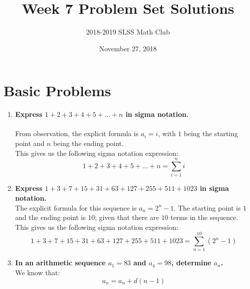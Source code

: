 \documentclass[12pt]{article}
\title{Week 7 Problem Set Solutions\vspace{-3mm}}
\author{2018-2019 SLSS Math Club\vspace{-5mm}}
\date{November 27, 2018\vspace{-5mm}}
\begin{document}
\maketitle

\newcommand{\bspace}{\\ \\ \\ \\ \\ \\ \\} 
\section*{Basic Problems}
\begin{enumerate}
    \item \textbf{Express $1 + 2 + 3 + 4 + 5 + \dots + n$ in sigma notation.} \\ \\
    From observation, the explicit formula is $a_i = i$, with $1$ being the starting point and $n$ being the ending point. \\
    
    This gives us the following sigma notation expression:
    \begin{equation*}
        1 + 2 + 3 + 4 + 5 + \dots + n = \sum_{i = 1}^n i
    \end{equation*}
    
    \item \textbf{Express $1 + 3 + 7 + 15 + 31 + 63 + 127 + 255 + 511 + 1023$ in sigma notation.} \\
    
    The explicit formula for this sequence is $a_n = 2^n - 1$. The starting point is $1$ and the ending point is $10$; given that there are $10$ terms in the sequence. \\
    
    This gives us the following sigma notation expression:
    \begin{equation*}
        1 + 3 + 7 + 15 + 31 + 63 + 127 + 255 + 511 + 1023 = \sum_{n = 1}^{10} (2^n - 1)
    \end{equation*}
    
    \item \textbf{In an arithmetic sequence $a_1 = 83$ and $a_4 = 98$, determine $a_n$.} \\
    
    We know that:
    \begin{equation*}
        a_n = a_n + d(n - 1)        
    \end{equation*}
    

\end{enumerate}
\end{document}
